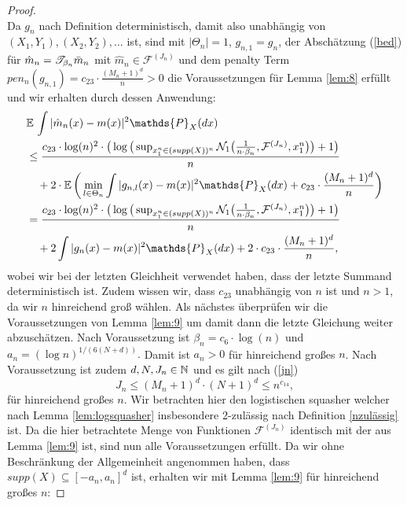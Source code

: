 \begin{proof}
\begin{equation}
\end{equation}
Da $g_n$ nach Definition deterministisch, damit also unabhängig von $(X_1, Y_1), (X_2, Y_2),\dots$ ist, sind mit $|\Theta_n| = 1$, $g_{n,1} = g_n$, der Abschätzung (\ref{bed}) für $\hat{m}_n = \mathscr{T}_{\beta_n}\bar{m}_n$ mit $\hat{m}_n \in \mathcal{F}^{(J_n)}$ und dem penalty Term $pen_n(g_{n,1}) = c_{23} \cdot \frac{(M_n + 1)^d}{n} > 0$ die Voraussetzungen für Lemma \ref{lem:8} erfüllt und wir erhalten durch dessen Anwendung:
\begin{equation*}
\begin{split}
& \E \int |\hat{m}_n(x) - m(x)|^2 \mathds{P}_X(dx) \\
& \leq \frac{c_{23} \cdot \log(n)^2 \cdot \big(\log\big(\sup_{x_1^n \in (supp(X))^n}\mathcal{N}_1\big(\frac{1}{n \cdot \beta_n},\mathcal{F}^{(J_n)},x_1^n\big)\big) + 1\big)}{n} \\
& \quad + 2 \cdot \E\bigg(\min_{l \in \Theta_n} \int |g_{n,l}(x) - m(x)|^2 \mathds{P}_X(dx) + c_{23} \cdot \frac{(M_n + 1)^d}{n}\bigg) \\
& = \frac{c_{23} \cdot \log(n)^2 \cdot \big(\log\big(\sup_{x_1^n \in (supp(X))^n}\mathcal{N}_1\big(\frac{1}{n \cdot \beta_n},\mathcal{F}^{(J_n)},x_1^n\big)\big) + 1\big)}{n} \\
& \quad + 2 \int |g_{n}(x) - m(x)|^2 \mathds{P}_X(dx) + 2 \cdot c_{23} \cdot \frac{(M_n + 1)^d}{n},
\end{split}
\end{equation*}
wobei wir bei der letzten Gleichheit verwendet haben, dass der letzte Summand deterministisch ist. Zudem wissen wir, dass $c_{23}$ unabhängig von $n$ ist und $n > 1$, da wir $n$ hinreichend groß wählen.
Als nächstes überprüfen wir die Voraussetzungen von Lemma \ref{lem:9} um damit dann die letzte Gleichung weiter abzuschätzen.
Nach Voraussetzung ist $\beta_n = c_6 \cdot \log(n)$ und $a_n = (\log n)^{1/(6(N + d))}.$ Damit ist $a_n > 0$ für hinreichend großes $n$. Nach Voraussetzung ist zudem $d, N, J_n \in \mathbb{N}$ und es gilt nach (\ref{jn}) 
$$J_n \leq (M_n + 1)^d \cdot (N + 1)^d \leq n^{c_{14}},$$
für hinreichend großes $n$. Wir betrachten hier den logistischen squasher welcher nach Lemma \ref{lem:logsquasher} insbesondere 2-zulässig nach Definition \ref{nzulässig} ist. Da die hier betrachtete Menge von Funktionen $\mathcal{F}^{(J_n)}$ identisch mit der aus Lemma \ref{lem:9} ist, sind nun alle Voraussetzungen erfüllt. Da wir ohne Beschränkung der Allgemeinheit angenommen haben, dass $supp(X) \subseteq [-a_n, a_n]^d$ ist, erhalten wir mit Lemma \ref{lem:9} für hinreichend großes $n$:

\end{proof}
